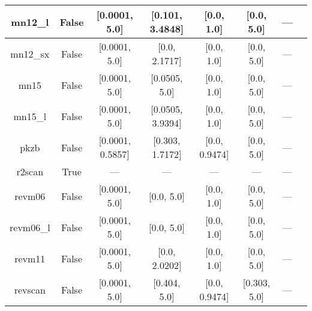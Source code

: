 \begin{tabular}{|c|c|c|c|c|c|c|l|}
      mn12\_l &                 False &    [0.0001, 5.0] &  [0.101, 3.4848] &       [0.0, 1.0] &     [0.0, 5.0] &        --- &                                                          \cite{Peverati2012_13171} \\ \hline
     mn12\_sx &                 False &    [0.0001, 5.0] &    [0.0, 2.1717] &       [0.0, 1.0] &     [0.0, 5.0] &        --- &                                                          \cite{Peverati2012_16187} \\ \hline
         mn15 &                 False &    [0.0001, 5.0] &    [0.0505, 5.0] &       [0.0, 1.0] &     [0.0, 5.0] &        --- &                                                                 \cite{Yu2016_5032} \\ \hline
      mn15\_l &                 False &    [0.0001, 5.0] & [0.0505, 3.9394] &       [0.0, 1.0] &     [0.0, 5.0] &        --- &                                                                 \cite{Yu2016_1280} \\ \hline
         pkzb &                 False & [0.0001, 0.5857] &  [0.303, 1.7172] &    [0.0, 0.9474] &     [0.0, 5.0] &        --- &                                                             \cite{Perdew1999_2544} \\ \hline
       r2scan &                  True &              --- &              --- &              --- &            --- &        --- &                                           \cite{Furness2020_8208,Furness2020_9248} \\ \hline
       revm06 &                 False &    [0.0001, 5.0] &       [0.0, 5.0] &       [0.0, 1.0] &     [0.0, 5.0] &        --- &                                                              \cite{Wang2018_10257} \\ \hline
    revm06\_l &                 False &    [0.0001, 5.0] &       [0.0, 5.0] &       [0.0, 1.0] &     [0.0, 5.0] &        --- &                                                               \cite{Wang2017_8487} \\ \hline
       revm11 &                 False &    [0.0001, 5.0] &    [0.0, 2.0202] &       [0.0, 1.0] &     [0.0, 5.0] &        --- &                                                              \cite{Verma2019_2966} \\ \hline
      revscan &                 False &    [0.0001, 5.0] &     [0.404, 5.0] &    [0.0, 0.9474] &   [0.303, 5.0] &        --- &                                                              \cite{Mezei2018_2469} \\ \hline

\end{tabular}
